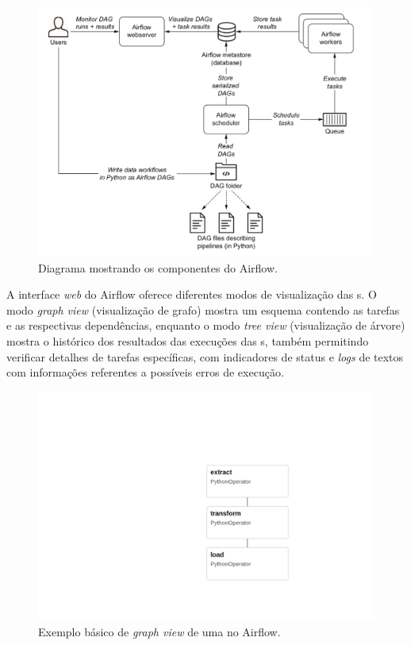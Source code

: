 \documentclass[
	12pt,				%
	oneside,			%
	a4paper,			%
	chapter=TITLE,		%
	section=TITLE,		%
	english,			%
	brazil				%
	]{abntex2}
\begin{document}
\begin{figure}[hb!]
	\caption{\label{fig:Fig_2}Diagrama mostrando os componentes do Airflow.}
	\begin{center}
		\includegraphics[scale=0.55]{images/airflow-components.png}
	\end{center}
\end{figure}

A interface \textit{web} do Airflow oferece diferentes modos de visualização das s. O modo \textit{graph view} (visualização de grafo) mostra um esquema contendo as tarefas e as respectivas dependências, enquanto o modo \textit{tree view} (visualização de árvore) mostra o histórico dos resultados das execuções das s, também permitindo verificar detalhes de tarefas específicas, com indicadores de status e \textit{logs} de textos com informações referentes a possíveis erros de execução.

\begin{figure}[h!]
	\caption{\label{fig:teste}Exemplo básico de \textit{graph view} de uma  no Airflow.}
	\begin{center}
		\includegraphics[trim={11cm 6cm 0 9cm},width=\textwidth]{images/tutorial_dag-graph (2).png}
	\end{center}
\end{figure}
\end{document}
